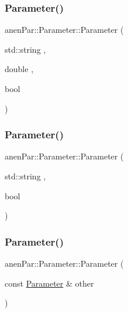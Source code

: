 \subsubsection{\texorpdfstring{Parameter()}{Parameter()}\hspace{0.1cm}{\footnotesize\ttfamily [4/6]}}
{\footnotesize\ttfamily anen\+Par\+::\+Parameter\+::\+Parameter (\begin{DoxyParamCaption}\item[{std\+::string}]{,  }\item[{double}]{,  }\item[{bool}]{ }\end{DoxyParamCaption})}

\mbox{\label{classanen_par_1_1_parameter_ac5eef55d40acfe03a9a741c5606ef0fc}} 
\subsubsection{\texorpdfstring{Parameter()}{Parameter()}\hspace{0.1cm}{\footnotesize\ttfamily [5/6]}}
{\footnotesize\ttfamily anen\+Par\+::\+Parameter\+::\+Parameter (\begin{DoxyParamCaption}\item[{std\+::string}]{,  }\item[{bool}]{ }\end{DoxyParamCaption})}

\mbox{\label{classanen_par_1_1_parameter_af9f49a6e54e55e223f14ed4603a49d3a}} 
\subsubsection{\texorpdfstring{Parameter()}{Parameter()}\hspace{0.1cm}{\footnotesize\ttfamily [6/6]}}
{\footnotesize\ttfamily anen\+Par\+::\+Parameter\+::\+Parameter (\begin{DoxyParamCaption}\item[{const \mbox{\hyperlink{classanen_par_1_1_parameter}{Parameter}} \&}]{other }\end{DoxyParamCaption})}

